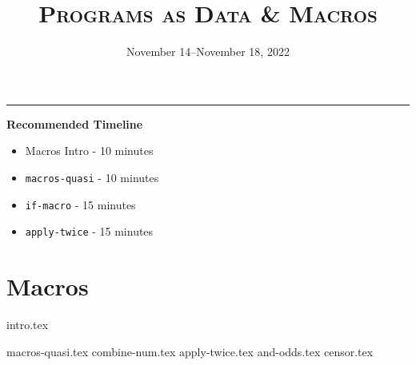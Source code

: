 \documentclass{exam}
\title{\textsc{Programs as Data \& Macros}}
\date{November 14--November 18, 2022}
\begin{document}
\maketitle
\rule{\textwidth}{0.15em}

\begin{guide}
\begin{blocksection}
    \textbf{Recommended Timeline}
    \begin{itemize}
        \item Macros Intro - 10 minutes
        \item \lstinline{macros-quasi} - 10 minutes
        \item \lstinline{if-macro} - 15 minutes
        \item \lstinline{apply-twice} - 15 minutes
    \end{itemize}
\end{blocksection}
\newpage
\end{guide}

\section{Macros}
{intro.tex}
\begin{questions}
{macros-quasi.tex}
{combine-num.tex}
{apply-twice.tex}
{and-odds.tex}
{censor.tex}
\end{questions}
\end{document}
